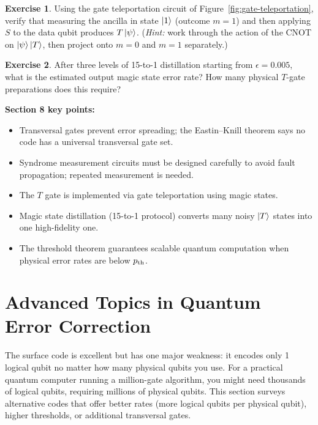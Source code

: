 \documentclass[11pt, a4paper]{article}
\theoremstyle{definition}
\newtheorem{exercise}{Exercise}[section]
\theoremstyle{plain}
\theoremstyle{remark}
\begin{document}
\begin{exercise}
Using the gate teleportation circuit of Figure~\ref{fig:gate-teleportation},
verify that measuring the ancilla in state $\ket{1}$ (outcome $m=1$) and
then applying $S$ to the data qubit produces $T\ket{\psi}$.
(\emph{Hint:} work through the action of the CNOT on $\ket{\psi}\ket{T}$,
then project onto $m=0$ and $m=1$ separately.)
\end{exercise}

\begin{exercise}
After three levels of 15-to-1 distillation starting from $\epsilon = 0.005$,
what is the estimated output magic state error rate?  How many physical
$T$-gate preparations does this require?
\end{exercise}

\begin{summarybox}
\textbf{Section 8 key points:}
\begin{itemize}
  \item Transversal gates prevent error spreading; the Eastin--Knill theorem
        says no code has a universal transversal gate set.
  \item Syndrome measurement circuits must be designed carefully to avoid
        fault propagation; repeated measurement is needed.
  \item The $T$ gate is implemented via gate teleportation using magic states.
  \item Magic state distillation (15-to-1 protocol) converts many noisy
        $\ket{T}$ states into one high-fidelity one.
  \item The threshold theorem guarantees scalable quantum computation when
        physical error rates are below $p_{\rm th}$.
\end{itemize}
\end{summarybox}

\newpage
\section{Advanced Topics in Quantum Error Correction}
\label{sec:advanced}

\begin{intuition}
The surface code is excellent but has one major weakness: it encodes only
1 logical qubit no matter how many physical qubits you use.  For a practical
quantum computer running a million-gate algorithm, you might need thousands
of logical qubits, requiring millions of physical qubits.  This section
surveys alternative codes that offer better rates (more logical qubits per
physical qubit), higher thresholds, or additional transversal gates.
\end{intuition}
\end{document}
